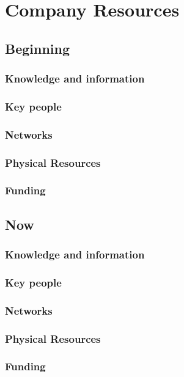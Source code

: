 \section{Company Resources}
\subsection{Beginning}
\subsubsection{Knowledge and information}
\subsubsection{Key people}
\subsubsection{Networks}
\subsubsection{Physical Resources}
\subsubsection{Funding}

\subsection{Now}
\subsubsection{Knowledge and information}
\subsubsection{Key people}
\subsubsection{Networks}
\subsubsection{Physical Resources}
\subsubsection{Funding}